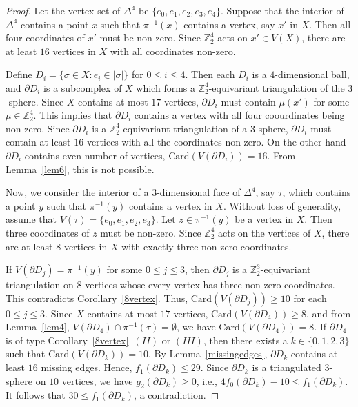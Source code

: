\documentclass[11pt]{amsart}
\numberwithin{equation}{section}
\theoremstyle{definition}
\newcommand{\D}{\Delta}
\def \bb{\mathbb}
\def \ZZ{{\bb{Z}}}
\begin{document}
\begin{proof}
Let the vertex set of $\D^4$ be $\{e_0, e_1, e_2, e_3, e_4\}$. Suppose that the interior of $\D^4$ contains a point $x$ such that $\pi^{-1}(x)$ contains a vertex, say $x'$ in $X$. Then all four coordinates of $x'$ must be non-zero. Since $\ZZ_2^4$ acts on $x'\in V(X)$, there are at least $16$ vertices in $X$ with all coordinates non-zero.

Define $D_i = \{\sigma \in X : e_i \in |\sigma|\}$ for $0 \leq i \leq 4$. Then each $D_i$ is a $4$-dimensional ball, and $\partial D_i$ is a subcomplex of $X$ which forms a $\ZZ_2^4$-equivariant triangulation of the $3$-sphere. 
Since $X$ contains at most $17$ vertices, $\partial D_i$ must contain $\mu(x')$ for some $\mu\in \ZZ_2^4$. This implies that $\partial D_i$ contains a vertex with all four coourdinates being non-zero. Since $\partial D_i$ is a $\ZZ_2^4$-equivariant triangulation of a $3$-sphere, $\partial D_i$ must contain at least $16$ vertices with all the coordinates non-zero. On the other hand $\partial D_i$ contains even number of vertices, $\mathrm{Card}(V(\partial D_i))=16$. From Lemma~\ref{lem6}, this is not possible.


Now, we consider the interior of a $3$-dimensional face of $\D^4$, say $\tau$, which contains a point $y$ such that $\pi^{-1}(y)$ contains a vertex in $X$. Without loss of generality, assume that $V(\tau) = \{e_0, e_1, e_2, e_3\}$. Let $z \in \pi^{-1}(y)$ be a vertex in $X$. Then three coordinates of $z$ must be non-zero. Since $\ZZ_2^4$ acts on the vertices of $X$, there are at least $8$ vertices in $X$ with exactly three non-zero coordinates.

If $V(\partial D_j) = \pi^{-1}(y)$ for some $0 \leq j \leq 3$, then $\partial D_j$ is a $\ZZ_2^3$-equivariant triangulation on $8$ vertices whose every vertex has three non-zero coordinates. This contradicts Corollary~\ref{8vertex}. Thus, $\mathrm{Card}(V(\partial D_j)) \geq 10$ for each $0 \leq j \leq 3$. Since $X$ contains at most $17$ vertices, $\mathrm{Card}(V(\partial D_4)) \geq 8$, and from Lemma~\ref{lem4}, $V(\partial D_4) \cap \pi^{-1}(\tau) = \emptyset$, we have $\mathrm{Card}(V(\partial D_4)) = 8$. If $\partial D_4$ is of type Corollary~\ref{8vertex}~$(II)$ or $(III)$, then there exists a $k \in \{0,1,2,3\}$ such that $\mathrm{Card}(V(\partial D_k)) = 10$. By Lemma~\ref{missingedges}, $\partial D_k$ contains at least $16$ missing edges. Hence, $f_1(\partial D_k) \leq 29$. Since $\partial D_k $ is a triangulated $3$-sphere on $10$ vertices, we have $g_2(\partial D_k) \geq 0$, i.e., $4f_0(\partial D_k) - 10 \leq f_1(\partial D_k)$. It follows that $30 \leq f_1(\partial D_k)$, a contradiction.


\end{proof}
\end{document}
